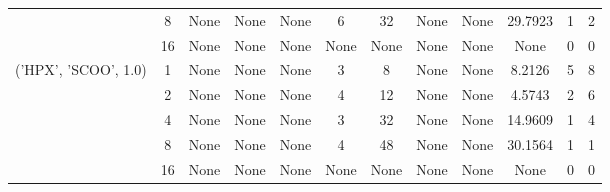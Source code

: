 \begin{tabular}{cccccccccccc}
& 8& None& None& None& 6& 32& None& None& 29.7923& 1& 2\\
& 16& None& None& None& None& None& None& None& None& 0& 0\\
\hline
\multirow{5}{*}{('HPX', 'SCOO', 1.0)}& 1& None& None& None& 3& 8& None& None& 8.2126& 5& 8\\
& 2& None& None& None& 4& 12& None& None& 4.5743& 2& 6\\
& 4& None& None& None& 3& 32& None& None& 14.9609& 1& 4\\
& 8& None& None& None& 4& 48& None& None& 30.1564& 1& 1\\
& 16& None& None& None& None& None& None& None& None& 0& 0\\
\hline
\end{tabular}



